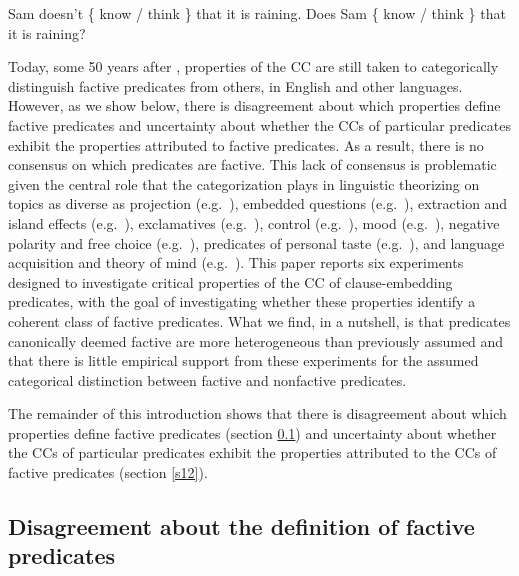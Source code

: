 \documentclass{language}
\newcommand{\6}{\mbox{$[\hspace*{-.6mm}[$}}
\newcommand{\9}{\mbox{$]\hspace*{-.6mm}]$}}
\begin{document}
\begin{exe}
\ex\label{kk1}
\begin{xlist}
\ex Sam doesn't \{ know / think  \} that it is raining.
\ex Does Sam \{ know / think  \} that it is raining?
\end{xlist}
\end{exe}

Today, some 50 years after \citealt{kiparsky-kiparsky70}, properties of the CC are still taken to categorically distinguish factive predicates from others, in English and other languages. However, as we show below, there is disagreement about which properties define factive predicates and uncertainty about whether the CCs of particular predicates exhibit the properties attributed to factive predicates. As a result, there is no consensus on which predicates are factive. This lack of consensus is problematic given the central role that the categorization plays in linguistic theorizing on topics as diverse as projection (e.g.\ \citealt{karttunen-peters79,vds92}), embedded questions (e.g.\ \citealt{hintikka1975,guerzoni-sharvit2007,spector-egre2015}), extraction and island effects (e.g.\ \citealt{hukari-levine1995,rooryck2000,abrusan2014}), exclamatives (e.g.\ \citealt{zanuttini-portner2003}), control (e.g.\ \citealt{landau2001}), mood (e.g.\ \citealt{van-gelderen2004,givon95,heycock2006,giannakidou-mari2015}), negative polarity and free choice (e.g.\ \citealt{giannakidou1998,giannakidou2001}), predicates of personal taste (e.g.\ \citealt{lasersohn2009}), and language acquisition and theory of mind (e.g.\ \citealt{devillers2005}). This paper reports six experiments designed to investigate critical properties of the CC of clause-embedding predicates, with the goal of investigating whether these properties identify a coherent class of factive predicates. What we find, in a nutshell, is that  predicates canonically deemed factive are more heterogeneous than previously assumed and that there is little empirical support from these experiments for the assumed categorical distinction between factive and nonfactive predicates.

The remainder of this introduction shows that there is disagreement about which properties define factive predicates (section \ref{s11}) and uncertainty about whether the CCs of particular predicates exhibit the properties attributed to the CCs of factive predicates (section \ref{s12}).

\subsection{Disagreement about the definition of factive predicates}\label{s11}
\end{document}
